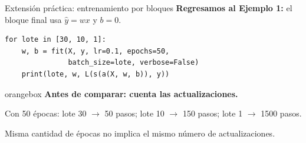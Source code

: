\documentclass[10pt,aspectratio=169,xcolor={dvipsnames}]{beamer}
\newenvironment{caja}[1][lgraybox]{\begin{beamercolorbox}[sep=0.7em,wd=\linewidth]{#1}}{\end{beamercolorbox}}
\begin{document}
\begin{frame}[fragile]{Extensión práctica: entrenamiento por bloques}
    \textbf{Regresamos al Ejemplo 1:} el bloque final usa $\hat y=wx$ y $b=0$.
\begin{lstlisting}
for lote in [30, 10, 1]:
    w, b = fit(X, y, lr=0.1, epochs=50,
               batch_size=lote, verbose=False)
    print(lote, w, L(s(a(X, w, b)), y))
\end{lstlisting}
    \begin{caja}[orangebox]
        \textbf{Antes de comparar: cuenta las actualizaciones.}\par\smallskip
        Con 50 épocas: lote 30 $\to$ 50 pasos; lote 10 $\to$ 150 pasos;
        lote 1 $\to$ 1500 pasos.
    \end{caja}
    \medskip
    \small Misma cantidad de épocas no implica el mismo número de actualizaciones.
\end{frame}
\end{document}
